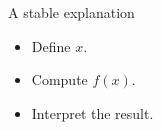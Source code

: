 \documentclass{beamer}
\begin{document}
\begin{frame}{A stable explanation}
\begin{itemize}
\item<1-> Define $x$.
\item<2-> Compute $f(x)$.
\item<3-> Interpret the result.
\end{itemize}
\end{frame}
\end{document}
